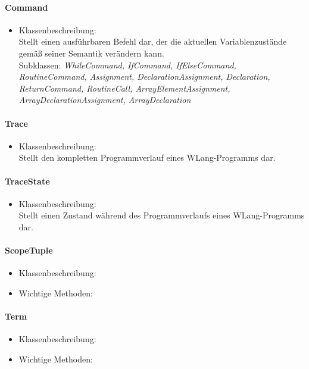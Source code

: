 \documentclass[parskip=full]{scrartcl}
\begin{document}
\paragraph{Command}
\begin{itemize}
\item Klassenbeschreibung: \\
Stellt einen ausführbaren Befehl dar, der die aktuellen Variablenzustände gemäß seiner Semantik verändern kann.\\
Subklassen: \textit{WhileCommand, IfCommand, IfElseCommand, RoutineCommand, Assignment, DeclarationAssignment, Declaration, ReturnCommand, RoutineCall, ArrayElementAssignment, ArrayDeclarationAssignment, ArrayDeclaration}
\end{itemize}
\paragraph{Trace}
\begin{itemize}
\item Klassenbeschreibung: \\
Stellt den kompletten Programmverlauf eines WLang-Programms dar.
\end{itemize}
\paragraph{TraceState}
\begin{itemize}
\item Klassenbeschreibung: \\
Stellt einen Zustand während des Programmverlaufs eines WLang-Programms dar.
\end{itemize}
\paragraph{ScopeTuple}
\begin{itemize}
\item Klassenbeschreibung: \\

\item Wichtige Methoden:\\
\end{itemize}
\paragraph{Term}
\begin{itemize}
\item Klassenbeschreibung: \\

\item Wichtige Methoden:\\


\end{itemize}
\end{document}
